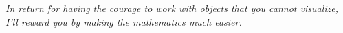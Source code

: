 
\par \emph{In return for having the courage to work with objects that you cannot visualize, I’ll reward you by making the mathematics much easier.}
\par {}